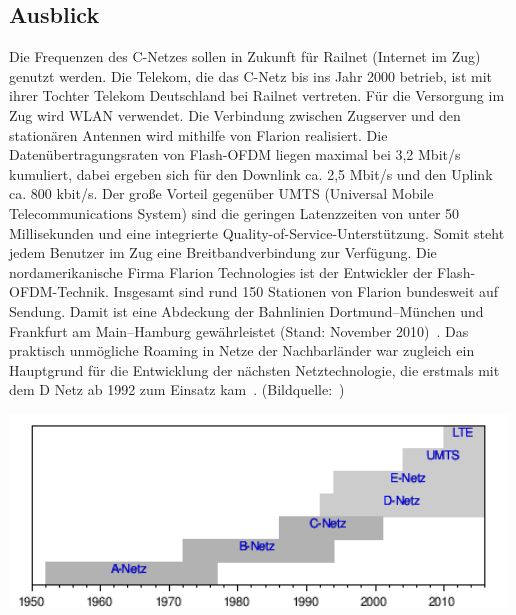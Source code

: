 \begin{multicols}{3}
\subsection*{Ausblick}
Die Frequenzen des C-Netzes sollen in Zukunft für Railnet (Internet im Zug) genutzt werden. Die Telekom, die das C-Netz bis ins Jahr 2000 betrieb, ist mit ihrer Tochter Telekom Deutschland bei Railnet vertreten. Für die Versorgung im Zug wird WLAN verwendet. Die Verbindung zwischen Zugserver und den stationären Antennen wird mithilfe von Flarion realisiert. Die Datenübertragungsraten von Flash-OFDM liegen maximal bei 3,2 Mbit/s kumuliert, dabei ergeben sich für den Downlink ca. 2,5 Mbit/s und den Uplink ca. 800 kbit/s. Der große Vorteil gegenüber UMTS (Universal Mobile Telecommunications System) sind die geringen Latenzzeiten von unter 50 Millisekunden und eine integrierte Quality-of-Service-Unterstützung. Somit steht jedem Benutzer im Zug eine Breitbandverbindung zur Verfügung. 
Die nordamerikanische Firma Flarion Technologies ist der Entwickler der Flash-OFDM-Technik. Insgesamt sind rund 150 Stationen von Flarion bundesweit auf Sendung. Damit ist eine Abdeckung der Bahnlinien Dortmund–München und Frankfurt am Main–Hamburg gewährleistet (Stand: November 2010)~\cite{c-netz.3}.
Das praktisch unmögliche Roaming in Netze der Nachbarländer war zugleich ein Hauptgrund für die Entwicklung der nächsten Netztechnologie, die erstmals mit dem D Netz ab 1992 zum Einsatz kam~\cite{c-netz.1}. (Bildquelle:~\cite{c-netz.9}) 
\printbibliography[segment=12,heading=subbibliography]
\end{multicols}
\begin{Figure}
\centering
\includegraphics[height=51mm]{Kapitel/C-Netz/Grafiken/ZeitstrahlWiki.png}
\end{Figure}
\newpage